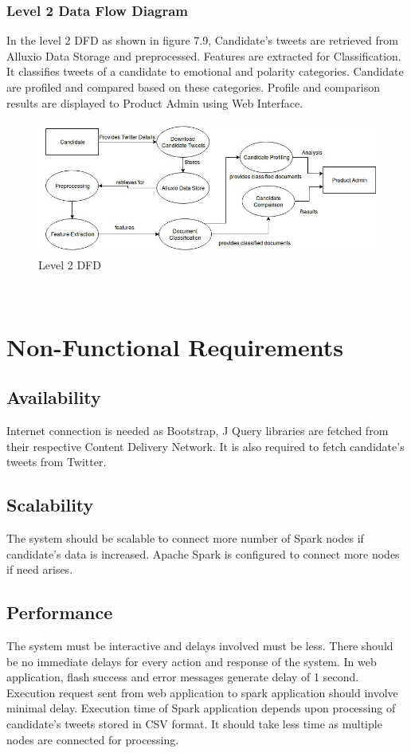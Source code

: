 \documentclass[oneside,a4paper,12pt]{pictreport}
\begin{document}
\subsubsection{Level 2 Data Flow Diagram}
In the level 2 DFD as shown in figure 7.9, Candidate's tweets are retrieved from Alluxio Data Storage and preprocessed. Features are extracted for Classification. It classifies tweets of a candidate to emotional and polarity categories. Candidate are profiled and compared based on these categories. Profile and comparison results are displayed to Product Admin using Web Interface.\\
\begin{figure}[h!]
\includegraphics[width=4.5in]{DFD-2.jpg}
\caption{Level 2 DFD}
\end{figure}
\\
\section{Non-Functional Requirements}
\subsection{Availability}
Internet connection is needed as Bootstrap, J Query libraries are fetched from their respective Content Delivery Network. It is also required to fetch candidate's tweets from Twitter.

\subsection{Scalability}
The system should be scalable to connect more number of Spark nodes if candidate's data is increased. Apache Spark is configured to connect more nodes if need arises.

\subsection{Performance}
The system must be interactive and delays involved must be less. There should be no immediate delays for every action and response of the system. In web application, flash success and error messages generate delay of 1 second. Execution request sent from web application to spark application should involve minimal delay. Execution time of Spark application depends upon processing of candidate's tweets stored in CSV format. It should take less time as multiple nodes are connected for processing.
\end{document}
